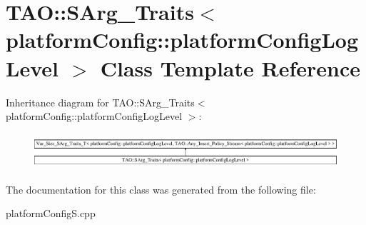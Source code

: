 \section{T\+AO\+:\+:S\+Arg\+\_\+\+Traits$<$ platform\+Config\+:\+:platform\+Config\+Log\+Level $>$ Class Template Reference}
\label{classTAO_1_1SArg__Traits_3_01platformConfig_1_1platformConfigLogLevel_01_4}
Inheritance diagram for T\+AO\+:\+:S\+Arg\+\_\+\+Traits$<$ platform\+Config\+:\+:platform\+Config\+Log\+Level $>$\+:\begin{figure}[H]
\begin{center}
\leavevmode
\includegraphics[height=1.330166cm]{classTAO_1_1SArg__Traits_3_01platformConfig_1_1platformConfigLogLevel_01_4}
\end{center}
\end{figure}


The documentation for this class was generated from the following file\+:\begin{DoxyCompactItemize}
\item 
platform\+Config\+S.\+cpp\end{DoxyCompactItemize}
